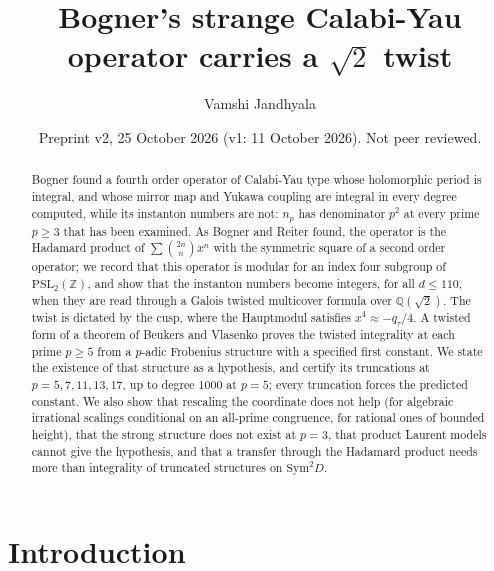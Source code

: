\documentclass[11pt]{amsart}
\title{Bogner's strange Calabi-Yau operator carries a $\sqrt2$ twist}
\author{Vamshi Jandhyala}
\date{Preprint v2, 25 October 2026 (v1: 11 October 2026). Not peer reviewed.}
\theoremstyle{definition}
\theoremstyle{remark}
\newcommand{\Z}{\mathbb{Z}}
\newcommand{\Q}{\mathbb{Q}}
\begin{document}
\begin{abstract}
Bogner found a fourth order operator of Calabi-Yau type whose holomorphic period is integral, and whose
mirror map and Yukawa coupling are integral in every degree computed, while its instanton numbers are not: $n_p$ has denominator $p^2$ at
every prime $p\ge3$ that has been examined. As Bogner and Reiter found, the operator is the Hadamard
product of $\sum\binom{2n}{n}x^n$ with the symmetric square of a second order operator; we record that this
operator is modular for an index four subgroup of $\mathrm{PSL}_2(\Z)$, and show that the instanton numbers
become integers, for all $d\le110$, when they are read through a Galois twisted multicover formula over
$\Q(\sqrt2)$. The
twist is dictated by the cusp, where the Hauptmodul satisfies $x^4\approx-q_\tau/4$. A twisted form
of a theorem of Beukers and Vlasenko proves the twisted integrality at each prime $p\ge5$ from a
$p$-adic Frobenius structure with a specified first constant. We state the existence of that
structure as a hypothesis, and certify its truncations at $p=5,7,11,13,17$, up to degree $1000$ at
$p=5$; every truncation forces the predicted constant. We also show that rescaling the coordinate
does not help (for algebraic irrational scalings conditional on an all-prime congruence, for rational
ones of bounded height), that the strong structure does not exist at $p=3$, that product Laurent
models cannot give the hypothesis, and that a transfer through the Hadamard product needs more than
integrality of truncated structures on $\mathrm{Sym}^2D$.
\end{abstract}

\maketitle

\section{Introduction}
\end{document}
